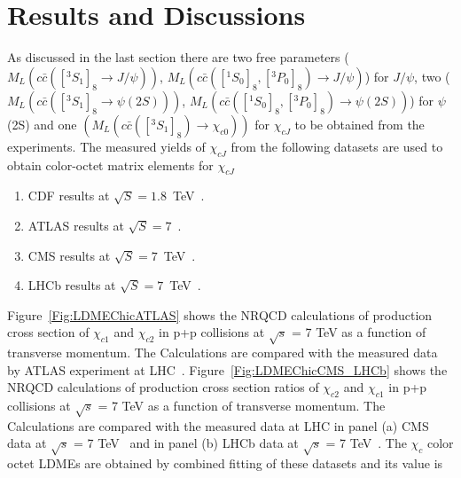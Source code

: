 \documentclass[12pt,a4paper,final]{iopart}
\newcommand{\barc}{{\bar{c}}}
\begin{document}
\section{Results and Discussions}
As discussed in the last section there are two free parameters ($M_{L}(c\barc([^3S_1]_{8}\rightarrow J/\psi))$,
 $M_{L}(c\barc([^1S_0]_{8},[^3P_0]_{8})\rightarrow J/\psi)$) for $J/\psi$, 
two ($M_{L}(c\barc([^3S_1]_{8}\rightarrow \psi(2S)))$, $M_{L}(c\barc([^1S_0]_{8},[^3P_0]_{8})\rightarrow \psi(2S))$)  
for $\psi$(2S) and one $(M_{L}(c\barc([^3S_1]_{8})\rightarrow \chi_{c0}))$ for $\chi_{cJ}$ to be obtained 
from the experiments. 
The measured yields of $\chi_{cJ}$ from the following datasets
are used to obtain color-octet matrix elements for $\chi_{cJ}$ 
\begin{enumerate}
\item{CDF results at $\sqrt{S}=1.8$~TeV~\cite{Abe:1997yz}}.
\item{ATLAS results at $\sqrt{S}=7$~\cite{ATLAS:2014ala}}.
\item{CMS results at $\sqrt{S}=7$~TeV~\cite{Chatrchyan:2012ub}}.
\item{LHCb results at $\sqrt{S}=7$~TeV~\cite{Aaij:2013dja}}.
\end{enumerate}
Figure~\ref{Fig:LDMEChicATLAS} shows the NRQCD calculations of production cross section 
of  $\chi_{c1}$ and $\chi_{c2}$ in p+p collisions at $\sqrt{s}$ = 7 TeV as a function of 
transverse momentum. The Calculations are compared with the measured data by
ATLAS experiment at LHC~\cite{ATLAS:2014ala}. Figure~\ref{Fig:LDMEChicCMS_LHCb} shows
the NRQCD calculations of production cross section ratios 
of $\chi_{c2}$ and $\chi_{c1}$ in p+p collisions at
$\sqrt{s}$ = 7 TeV as a function of transverse momentum. 
The Calculations are compared with the measured data at
LHC in panel (a) CMS data at $\sqrt{s}$ = 7 TeV~\cite{Chatrchyan:2012ub}
and in panel (b) LHCb data at $\sqrt{s}$ = 7 TeV~\cite{Aaij:2013dja}.  
The $\chi_{c}$ color octet LDMEs are obtained by combined fitting of these datasets
and its value is 
\end{document}
